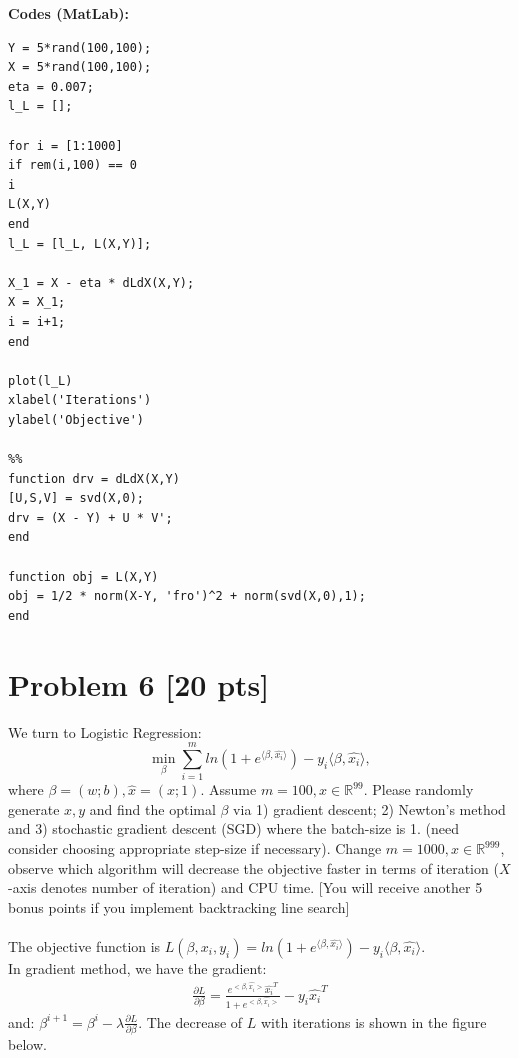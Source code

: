 \documentclass[11pt]{article}
\newcommand{\R}{\mathbb{R}}
\def \lg       {\langle}
\def \rg       {\rangle}
\def \R {\mathbb{R}}
\begin{document}
\textbf{Codes (MatLab):}
\begin{verbatim}
Y = 5*rand(100,100);
X = 5*rand(100,100);
eta = 0.007;
l_L = [];

for i = [1:1000]
if rem(i,100) == 0
i
L(X,Y)
end
l_L = [l_L, L(X,Y)];

X_1 = X - eta * dLdX(X,Y);
X = X_1;
i = i+1;
end

plot(l_L)
xlabel('Iterations')
ylabel('Objective')

%%
function drv = dLdX(X,Y)
[U,S,V] = svd(X,0);
drv = (X - Y) + U * V';
end

function obj = L(X,Y)
obj = 1/2 * norm(X-Y, 'fro')^2 + norm(svd(X,0),1);
end
\end{verbatim}


\newpage
\section*{Problem 6 [20 pts]}
We turn to Logistic Regression:
\begin{equation}
	\min_\beta \sum\limits_{i=1}^{m} ln(1+e^{\lg \beta, \hat{x_i}\rg})-y_{i}\lg \beta, \hat{x_i}\rg, 
\end{equation}
where $\beta=(w;b), \hat{x}=(x;1)$. Assume $m=100, x\in\R^{99}$. Please randomly generate $x, y$ and find the optimal $\beta$ via 1) gradient descent; 2) Newton's method and 3) stochastic gradient descent (SGD) where the batch-size is 1. (need consider choosing appropriate  step-size if necessary). Change $m=1000, x\in\R^{999}$, observe which algorithm will decrease the objective faster in terms of iteration ($X$-axis denotes number of iteration) and CPU time. [You will receive another 5 bonus points if you implement backtracking line search]\\ \\
The objective function is $L(\beta,x_i,y_i) = ln(1+e^{\lg \beta, \hat{x_i}\rg})-y_{i}\lg \beta, \hat{x_i}\rg$.\\
In gradient method, we have the gradient:
\begin{equation}
	\begin{aligned}
		\frac{\partial L}{\partial \beta}=\frac{e^{<\beta,\hat{x_i}>}\hat{x_i}^T}{1+e^{<\beta,\hat{x_i}>}}-y_i\hat{x_i}^T
	\end{aligned}
\end{equation}
and: $\beta^{i+1}=\beta^i-\lambda\frac{\partial L}{\partial \beta}$. The decrease of $L$ with iterations is shown in the figure below.
\end{document}
